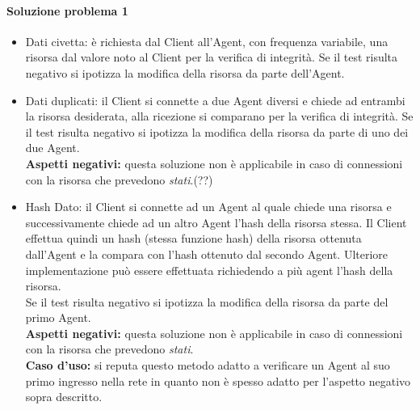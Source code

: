 \documentclass[]{article}
\begin{document}
	\paragraph{Soluzione problema 1}
	\begin{itemize}
		\item Dati civetta: è richiesta dal Client all'Agent, con frequenza variabile, una risorsa dal valore noto al Client per la verifica di integrità. Se il test risulta negativo si ipotizza la modifica della risorsa da parte dell'Agent.
		\item Dati duplicati: il Client si connette a due Agent diversi e chiede ad entrambi la risorsa desiderata, alla ricezione si comparano per la verifica di integrità. Se il test risulta negativo si ipotizza la modifica della risorsa da parte di uno dei due Agent.\\
		\textbf{Aspetti negativi:} questa soluzione non è applicabile in caso di connessioni con la risorsa che prevedono \textit{stati}.(??)
		\item Hash Dato: il Client si connette ad un Agent al quale chiede una risorsa e successivamente chiede ad un altro Agent l'hash della risorsa stessa. Il Client effettua quindi un hash (stessa funzione hash) della risorsa ottenuta dall'Agent e la compara con l'hash ottenuto dal secondo Agent. Ulteriore implementazione può essere effettuata richiedendo a più agent l'hash della risorsa.\\
		Se il test risulta negativo si ipotizza la modifica della risorsa da parte del primo Agent.\\
		\textbf{Aspetti negativi:} questa soluzione non è applicabile in caso di connessioni con la risorsa che prevedono \textit{stati}.\\
		\textbf{Caso d'uso:} si reputa questo metodo adatto a verificare un Agent al suo primo ingresso nella rete in quanto non è spesso adatto per l'aspetto negativo sopra descritto.		
	\end{itemize}
	
\end{document}
